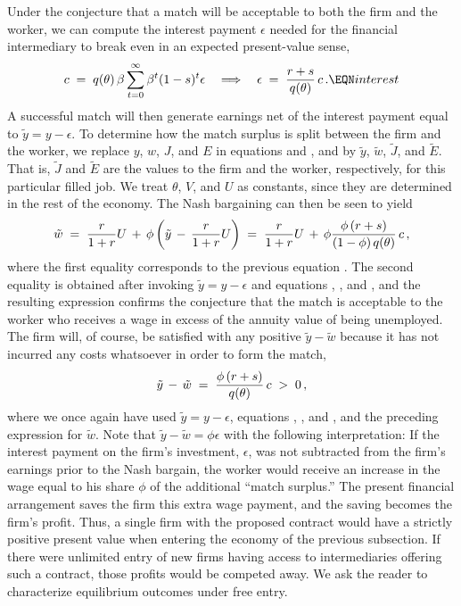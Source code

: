 Under the conjecture that a match will be acceptable to both the
firm and the worker, we can compute the interest payment $\epsilon$
needed for the financial intermediary to break even in an expected
present-value sense,
$$
c\;=\; q(\theta) \, \beta  \sum_{t=0}^\infty
                          \beta^t (1-s)^t \epsilon
\quad \Longrightarrow \quad \epsilon \;=\; {r+s \over q(\theta)} \, c\,.
                                                            \EQN interest
$$
A successful match will then generate earnings net of the interest
payment equal to $\tilde y = y - \epsilon$. To determine how the
match surplus is split between the firm and the worker, we replace
$y$, $w$, $J$, and $E$ in equations  and , and
 by $\tilde y$, $\tilde w$, $\tilde J$, and $\tilde E$.
That is, $\tilde J$ and $\tilde E$ are the values to the firm and the worker,
respectively, for this particular filled job. We treat $\theta$, $V$, and
$U$ as constants, since they are determined in the rest of the
economy. The Nash bargaining can then be seen to yield
$$
\tilde w \;=\; {r \over 1+r} U \,+\,
                  \phi\left(\tilde y\,-\, {r \over 1+r} U\right)
         \;=\; {r \over 1+r} U \,+\, \phi {\phi \, (r+s) \over
                  (1-\phi)\,q(\theta) } \,c \,,
$$
where the first equality corresponds to the previous equation .
The second equality is obtained after invoking
$\tilde y = y - \epsilon$ and equations , ,
and , and the resulting
expression confirms the conjecture that the match is
acceptable to the worker who receives a wage in excess of the
annuity value of being unemployed. The firm will, of course, be
satisfied with any positive $\tilde y - \tilde w$ because it has
not incurred any costs whatsoever in order to form the match,
$$
\tilde y \,-\, \tilde w \;=\; {\phi \, (r+s) \over q(\theta)} \, c\;>\;0\,,
$$
where we once again have used $\tilde y = y - \epsilon$, equations
, , and , and the
preceding expression for $\tilde w$. Note that $\tilde y - \tilde w =
\phi \epsilon$ with the following interpretation:
If the interest payment on the firm's investment, $\epsilon$, was
not subtracted
from the firm's earnings prior to the Nash bargain, the worker
would receive an increase in the wage equal to his share $\phi$ of
the additional ``match surplus.'' The present financial arrangement
saves the firm this extra wage payment, and the saving becomes the
firm's profit.  Thus, a single firm with the proposed contract
would have a strictly positive present value when entering the
economy of the previous subsection. If there were unlimited  entry of new firms having
access to intermediaries offering such a contract, those profits would be
competed away.  We ask the reader to characterize equilibrium outcomes
under free entry.

